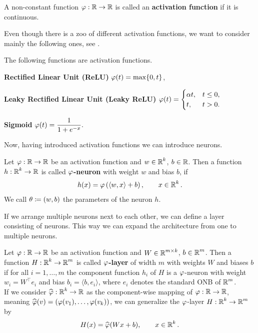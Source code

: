 \begin{definition}
A non-constant function $\operatorname{\varphi}: \operatorname{\mathbb{R}} \to \operatorname{\mathbb{R}}$ is called an \textbf{activation function} if it is continuous.
\end{definition}


Even though there is a zoo of different activation functions, we want to consider mainly the following ones, see \cite[chapter~6]{goodfellow2016deep}.


\begin{example}
The following functions are activation functions.
\begin{mydescription}{}
\item[\textbf{Rectified Linear Unit (ReLU)}] $\operatorname{\varphi}(t) = \max\{0, t\}$,
\item[\textbf{Leaky Rectified Linear Unit (Leaky ReLU)}] $\displaystyle \operatorname{\varphi}(t) = \begin{cases}
\alpha t, 	& t \leq 0,\\
t,		& t > 0.
\end{cases}$
\item[\textbf{Sigmoid}] $\displaystyle \operatorname{\varphi}(t) = \frac{1}{1 + e^{-x}}.$
\end{mydescription}
\end{example}


Now, having introduced activation functions we can introduce neurons.


\begin{definition}
Let $\operatorname{\varphi}: \operatorname{\mathbb{R}} \to \operatorname{\mathbb{R}}$ be an activation function and $w\in \operatorname{\mathbb{R}}^k$, $b \in \operatorname{\mathbb{R}}$. Then a function $h: \operatorname{\mathbb{R}}^k \to \operatorname{\mathbb{R}}$ is called \textbf{$\operatorname{\varphi}$-neuron} with weight $w$ and bias $b$, if
\begin{align}\label{def_neuron}
h(x) = \operatorname{\varphi} \left(\langle w, x \rangle + b \right), \qquad x \in \operatorname{\mathbb{R}}^k.
\end{align}
We call $\theta \coloneqq (w, b)$ the parameters of the neuron $h$.
\end{definition}


If we arrange multiple neurons next to each other, we can define a layer consisting of neurons. This way we can expand the architecture from one to multiple neurons.


\begin{definition}\label{def_layer}
Let $\operatorname{\varphi}: \operatorname{\mathbb{R}} \to \operatorname{\mathbb{R}}$ be an activation function and $W \in \operatorname{\mathbb{R}}^{m\times k}$, $b\in \operatorname{\mathbb{R}}^m$. Then a function $H:\operatorname{\mathbb{R}}^k \to \operatorname{\mathbb{R}}^m$ is called \textbf{$\operatorname{\varphi}$-layer} of width $m$ with weights $W$ and biases $b$ if for all $i=1,\ldots,m$ the component function $h_i$ of $H$ is a $\operatorname{\varphi}$-neuron with weight $w_i = W^\top e_i$ and bias $b_i = \langle b, e_i \rangle$, where $e_i$ denotes the standard ONB of $\operatorname{\mathbb{R}}^m$.\\
If we consider $\widehat{\operatorname{\varphi}}: \operatorname{\mathbb{R}}^k \to \operatorname{\mathbb{R}}$ as the component-wise mapping of $\operatorname{\varphi}:\operatorname{\mathbb{R}}\to \operatorname{\mathbb{R}}$, meaning $\widehat{\operatorname{\varphi}}(v) = (\operatorname{\varphi}(v_1), \ldots, \operatorname{\varphi}(v_k))$, we can generalize the $\operatorname{\varphi}$-layer $H:\operatorname{\mathbb{R}}^k \to \operatorname{\mathbb{R}}^m$ by
\begin{align}
H(x) = \widehat{\operatorname{\varphi}}(Wx + b), \qquad x \in \operatorname{\mathbb{R}} ^k.
\end{align}
\end{definition}


